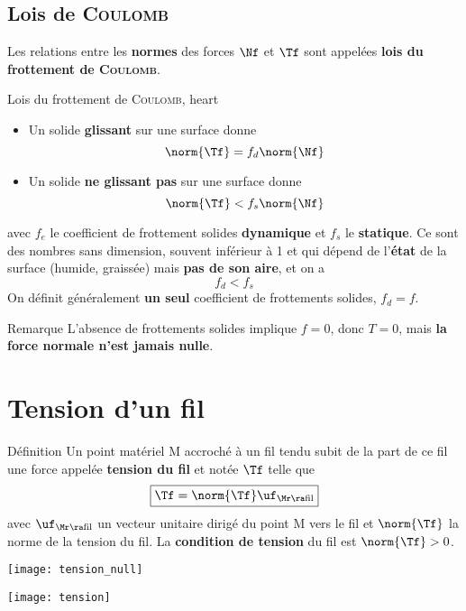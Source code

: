 \documentclass[../main/main.tex]{subfiles}
\begin{document}
\subsection{Lois de \textsc{Coulomb}}
Les relations entre les \textbf{normes} des forces $\Nf$ et $\Tf$ sont appelées
\textbf{lois du frottement de \textsc{Coulomb}}.

\begin{tprop}{Lois du frottement de \textsc{Coulomb}, heart}
    \begin{itemize}
        \item Un solide \textbf{glissant} sur une surface donne
            \[\norm{\Tf} = f_d\norm{\Nf}\]
        \item Un solide \textbf{ne glissant pas} sur une surface donne
            \[\norm{\Tf} < f_s\norm{\Nf}\]
    \end{itemize}
    avec $f_e$ le coefficient de frottement solides \textbf{dynamique} et $f_s$
    le \textbf{statique}. Ce sont des nombres sans
    dimension, souvent inférieur à 1 et qui dépend de l'\textbf{état} de la
    surface (humide, graissée) mais \textbf{pas de son aire}, et on a
    \[f_d < f_s\]
    On définit généralement \textbf{un seul} coefficient de frottements solides,
    $\boxed{f_d = f}$.
\end{tprop}

\begin{rexem}{Remarque}
    L'absence de frottements solides implique $f=0$, donc $T = 0$, mais
    \textbf{la force normale n'est jamais nulle}.
\end{rexem}

\section{Tension d'un fil}
\begin{tdefi}{Définition}
    Un point matériel M accroché à un fil tendu subit de la part de ce fil une
    force appelée \textbf{tension du fil} et notée $\Tf$ telle que
    \[\boxed{\Tf = \norm{\Tf}\uf_{\Mr\ra\rm fil}}\]
    avec $\uf_{\Mr\ra\rm fil}$ un vecteur unitaire dirigé du point M vers le fil
    et $\norm{\Tf}$ la norme de la tension du fil. La \textbf{condition de
    tension} du fil est $\norm{\Tf} > 0$.

    \begin{minipage}{0.45\linewidth}
        \begin{center}
            \texttt{[image: tension\_null]}
        \end{center}
    \end{minipage}
    \hfill
    \begin{minipage}{0.45\linewidth}
        \begin{center}
            \texttt{[image: tension]}%
        \end{center}
    \end{minipage}
\end{tdefi}
\end{document}
